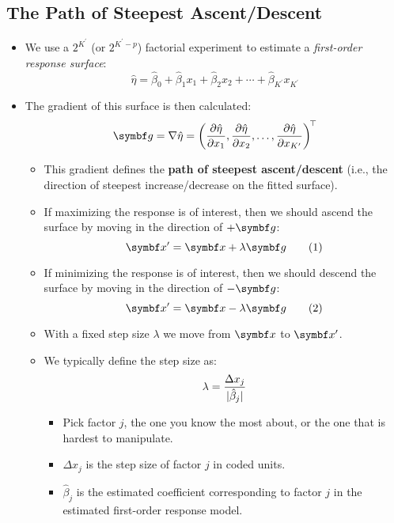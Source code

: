 \subsection{The Path of Steepest Ascent/Descent}
\begin{itemize}
    \item We use a $ 2^{K^\prime} $ (or $ 2^{K^\prime-p} $) factorial experiment to estimate a \emph{first-order response surface}:
          \[ \hat{\eta}=\hat{\beta}_0+\hat{\beta}_1x_1+\hat{\beta}_2x_2+\cdots+\hat{\beta}_{K^\prime}x_{K^\prime} \]
    \item The gradient of this surface is then calculated:
          \[ \Vector{g}=\nabla \hat{\eta}=\biggl(\pdv{\hat{\eta}}{x_1},\pdv{\hat{\eta}}{x_2},\ldots,\pdv{\hat{\eta}}{x_{K^\prime}}\biggr)^{\!\top} \]
          \begin{itemize}
              \item This gradient defines the \textbf{path of steepest ascent/descent} (i.e., the direction of steepest increase/decrease on the fitted surface).
              \item If maximizing the response is of interest, then we should ascend the surface by moving in the
                    direction of $ +\Vector{g} $:
                    \begin{equation}
                        \Vector{x}^\prime=\Vector{x}+\lambda \Vector{g}\label{eq:maxgr}\tag*{(1)}
                    \end{equation}
              \item If minimizing the response is of interest, then we should descend the surface by moving in the
                    direction of $ -\Vector{g} $:
                    \begin{equation}
                        \Vector{x}^\prime=\Vector{x}-\lambda \Vector{g}\label{eq:mingr}\tag*{(2)}
                    \end{equation}
              \item With a fixed step size $ \lambda $ we move from $ \Vector{x} $ to $ \Vector{x}^\prime $.
              \item We typically define the step size as:
                    \[ \lambda=\frac{\Delta x_j}{\lvert\hat{\beta}_j\rvert}  \]
                    \begin{itemize}
                        \item Pick factor $ j $, the one you know the most about, or the one that is hardest to manipulate.
                        \item $ \Delta x_j $ is the step size of factor $ j $ in coded units.
                        \item $ \hat{\beta}_j $ is the estimated coefficient corresponding to factor $ j $ in the estimated first-order response model.
                    \end{itemize}
          \end{itemize}
\end{itemize}
